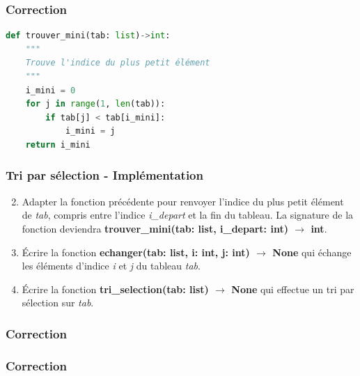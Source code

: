\documentclass[svgnames,11pt]{beamer}
\begin{document}
\begin{frame}[fragile]
    \frametitle{Correction}

    \begin{center}
    \begin{lstlisting}[language=Python, basicstyle=\small]
def trouver_mini(tab: list)->int:
    """
    Trouve l'indice du plus petit élément
    """
    i_mini = 0
    for j in range(1, len(tab)):
        if tab[j] < tab[i_mini]:
            i_mini = j
    return i_mini
    \end{lstlisting}
    \end{center}

\end{frame}
\begin{frame}
    \frametitle{Tri par sélection - Implémentation}
    \setcounter{compteuractivite}{1}
    \begin{activite}        
        \begin{enumerate}
            \setcounter{enumi}{1}
            \item Adapter la fonction précédente pour renvoyer l'indice du plus petit élément de \emph{tab}, compris entre l'indice \emph{i\_depart} et la fin du tableau. La signature de la fonction deviendra \textbf{trouver\_mini(tab: list, i\_depart: int) $\rightarrow$ int}.
            \item Écrire la fonction \textbf{echanger(tab: list, i: int, j: int) $\rightarrow$ None} qui échange les éléments d'indice \emph{i} et \emph{j} du tableau \emph{tab}.
            \item Écrire la fonction \textbf{tri\_selection(tab: list) $\rightarrow$ None} qui effectue un tri par sélection sur \emph{tab}.
        \end{enumerate}
    \end{activite}

\end{frame}

\begin{frame}
    \frametitle{Correction}

    

\end{frame}

\begin{frame}
    \frametitle{Correction}

    

\end{frame}
\end{document}
